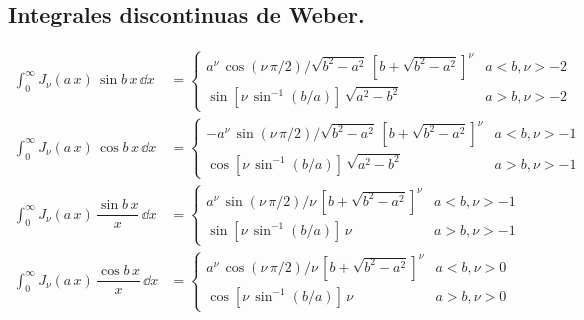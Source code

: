 \subsection{Integrales discontinuas de Weber.}
\begin{align*}
\int_{0}^{\infty} J_{\nu} (a \, x) \, \sin b \, x \, \dd x &=
\begin{cases}
a^{\nu} \, \cos (\nu \, \pi /2)/\sqrt{b^{2} - a^{2}} \, [b + \sqrt{b^{2} - a^{2}}]^{\nu} & a < b,  \nu > -2 \\
\sin [\nu \, \sin^{-1} (b/a)] \, \sqrt{a^{2} - b^{2}} & a > b, \nu > -2 
\end{cases} \\[1em]
\int_{0}^{\infty} J_{\nu} (a \, x) \, \cos b \, x \, \dd x &=
\begin{cases}
-a^{\nu} \, \sin (\nu \, \pi /2)/\sqrt{b^{2} - a^{2}} \, [b + \sqrt{b^{2} - a^{2}}]^{\nu} & a < b,  \nu > -1 \\
\cos [\nu \, \sin^{-1} (b/a)] \, \sqrt{a^{2} - b^{2}} & a > b, \nu > -1 
\end{cases} \\[1em]
\int_{0}^{\infty} J_{\nu} (a \, x) \, \dfrac{\sin b \, x}{x} \, \dd x &=
\begin{cases}
a^{\nu} \, \sin (\nu \, \pi /2)/ \nu \, [b + \sqrt{b^{2} - a^{2}}]^{\nu} & a < b,  \nu > -1 \\
\sin [\nu \, \sin^{-1} (b/a)] \, \nu & a > b, \nu > -1  
\end{cases} \\[1em]
\int_{0}^{\infty} J_{\nu} (a \, x) \, \dfrac{\cos b \, x}{x} \, \dd x &=
\begin{cases}
a^{\nu} \, \cos (\nu \, \pi /2)/ \nu \, [b + \sqrt{b^{2} - a^{2}}]^{\nu} & a < b,  \nu > 0 \\
\cos [\nu \, \sin^{-1} (b/a)] \, \nu & a > b, \nu > 0  
\end{cases}
\end{align*}
